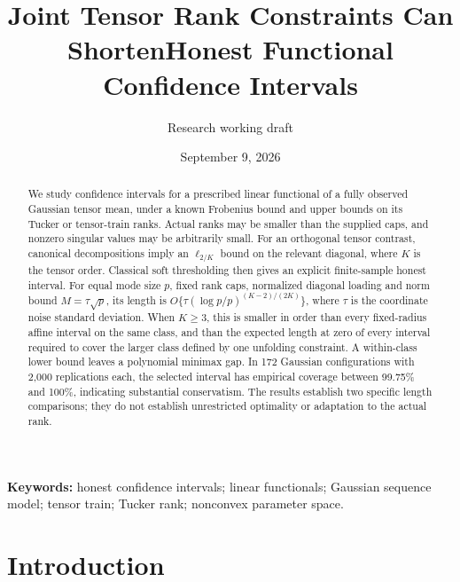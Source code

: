 \documentclass[11pt]{article}
\title{Joint Tensor Rank Constraints Can Shorten\newline Honest Functional Confidence Intervals}
\author{Research working draft}
\date{September 9, 2026}
\theoremstyle{remark}
\begin{document}
\maketitle
\begin{center}
\end{center}

\begin{abstract}
We study confidence intervals for a prescribed linear functional of a fully observed Gaussian tensor mean, under a known Frobenius bound and upper bounds on its Tucker or tensor-train ranks. Actual ranks may be smaller than the supplied caps, and nonzero singular values may be arbitrarily small. For an orthogonal tensor contrast, canonical decompositions imply an $\ell_{2/K}$ bound on the relevant diagonal, where $K$ is the tensor order. Classical soft thresholding then gives an explicit finite-sample honest interval. For equal mode size $p$, fixed rank caps, normalized diagonal loading and norm bound $M=\tau\sqrt p$, its length is $O\{\tau(\log p/p)^{(K-2)/(2K)}\}$, where $\tau$ is the coordinate noise standard deviation. When $K\ge3$, this is smaller in order than every fixed-radius affine interval on the same class, and than the expected length at zero of every interval required to cover the larger class defined by one unfolding constraint. A within-class lower bound leaves a polynomial minimax gap. In 172 Gaussian configurations with 2,000 replications each, the selected interval has empirical coverage between 99.75\% and 100\%, indicating substantial conservatism. The results establish two specific length comparisons; they do not establish unrestricted optimality or adaptation to the actual rank.
\end{abstract}

\noindent\textbf{Keywords:} honest confidence intervals; linear functionals; Gaussian sequence model; tensor train; Tucker rank; nonconvex parameter space.

\section{Introduction}\label{sec:intro}
\end{document}

